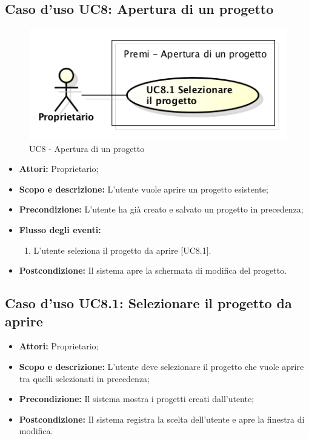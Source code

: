 \subsection{Caso d'uso UC8: Apertura di un progetto}
\begin{figure}[h] 
	\centering 
	\includegraphics[scale=0.45] {img/UC8.png} 
	\caption{UC8 - Apertura di un progetto} 
\end{figure}

\begin{itemize}
	\item \textbf{Attori:} Proprietario;
	\item \textbf{Scopo e descrizione:} L'utente vuole aprire un progetto esistente;
	\item \textbf{Precondizione:} L'utente ha già creato e salvato un progetto in precedenza;
	\item \textbf{Flusso degli eventi:}
	\begin{enumerate}
		\item L'utente seleziona il progetto da aprire [UC8.1].
	\end{enumerate}
	\item \textbf{Postcondizione:} Il sistema apre la schermata di modifica del progetto.
\end{itemize}


\subsection{Caso d'uso UC8.1: Selezionare il progetto da aprire}
\begin{itemize}
	\item \textbf{Attori:} Proprietario;
	\item \textbf{Scopo e descrizione:} L'utente deve selezionare il progetto che vuole aprire tra quelli selezionati in precedenza;
	\item \textbf{Precondizione:} Il sistema mostra i progetti creati dall'utente;
	\item \textbf{Postcondizione:} Il sistema registra la scelta dell'utente e apre la finestra di modifica.
\end{itemize}